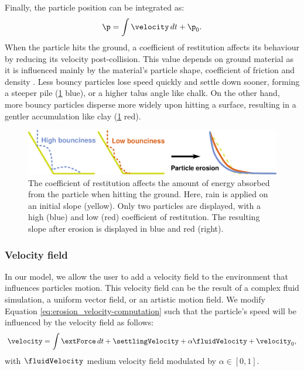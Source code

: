 Finally, the particle position can be integrated as: 
\begin{align} \nonumber
\p = \int{ \velocity \, dt} + \p_0.
\end{align}
When the particle hits the ground, a coefficient of restitution affects its behaviour by reducing its velocity post-collision. This value depends on ground material as it is influenced mainly by the material's particle shape, coefficient of friction and density \cite{Yan2020}. Less bouncy particles lose speed quickly and settle down sooner, forming a steeper pile (\cref{fig:erosion_coefficient of restitution-diagram} blue), or a higher talus angle like chalk. On the other hand, more bouncy particles disperse more widely upon hitting a surface, resulting in a gentler accumulation like clay (\cref{fig:erosion_coefficient of restitution-diagram} red).
\begin{figure}
\centering
\includegraphics{figures/bounciness.pdf}
\caption{The coefficient of restitution affects the amount of energy absorbed from the particle when hitting the ground. Here, rain is applied on an initial slope (yellow). Only two particles are displayed, with a high (blue) and low (red) coefficient of restitution. The resulting slope after erosion is displayed in blue and red (right). }
\label{fig:erosion_coefficient of restitution-diagram}

\end{figure}

\subsubsection{Velocity field}
\label{sec:erosion_velocity_field_refinement}
In our model, we allow the user to add a velocity field to the environment that influences particles motion. This velocity field can be the result of a complex fluid simulation, a uniform vector field, or an artistic motion field.
We modify Equation \eqref{eq:erosion_velocity-computation} such that the particle's speed will be influenced by the velocity field as follows:
\begin{align} \label{eq:erosion_velocity-computation-final}
\velocity = \int{ \extForce \, dt} + \settlingVelocity + \alpha \fluidVelocity + \velocity_0,
\end{align}
with $\fluidVelocity$ medium velocity field modulated by $\alpha \in [0,1]$. 

